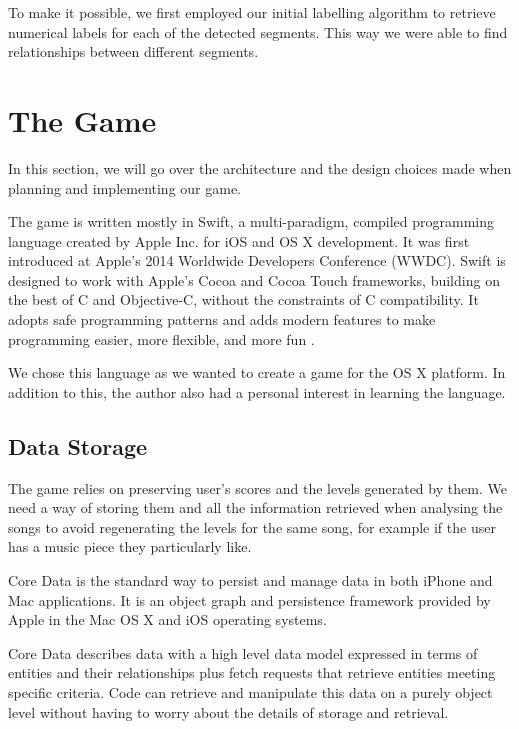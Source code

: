To make it possible, we first employed our initial labelling algorithm to retrieve numerical labels for each of the detected segments. This way we were able to find relationships between different segments. 





\vspace{20pt}




\section{The Game}

In this section, we will go over the architecture and the design choices made when planning and implementing our game.

The game is written mostly in Swift, a multi-paradigm, compiled programming language created by Apple Inc. for iOS and OS X development. 
It was first introduced at Apple's 2014 Worldwide Developers Conference (WWDC). Swift is designed to work with Apple's Cocoa and Cocoa Touch frameworks, building on the best of C and Objective-C, without the constraints of C compatibility. It adopts safe programming patterns and adds modern features to make programming easier, more flexible, and more fun \cite{swiftintro}. 

We chose this language as we wanted to create a game for the OS X platform. In addition to this, the author also had a personal interest in learning the language.

\vspace{10pt}


\subsection{Data Storage}

The game relies on preserving user's scores and the levels generated by them. We need a way of storing them and all the information retrieved when analysing the songs to avoid regenerating the levels for the same song, for example if the user has a music piece they particularly like.

Core Data is the standard way to persist and manage data in both iPhone and Mac applications. It is an object graph and persistence framework provided by Apple in the Mac OS X and iOS operating systems. 

Core Data describes data with a high level data model expressed in terms of entities and their relationships plus fetch requests that retrieve entities meeting specific criteria. Code can retrieve and manipulate this data on a purely object level without having to worry about the details of storage and retrieval. 

